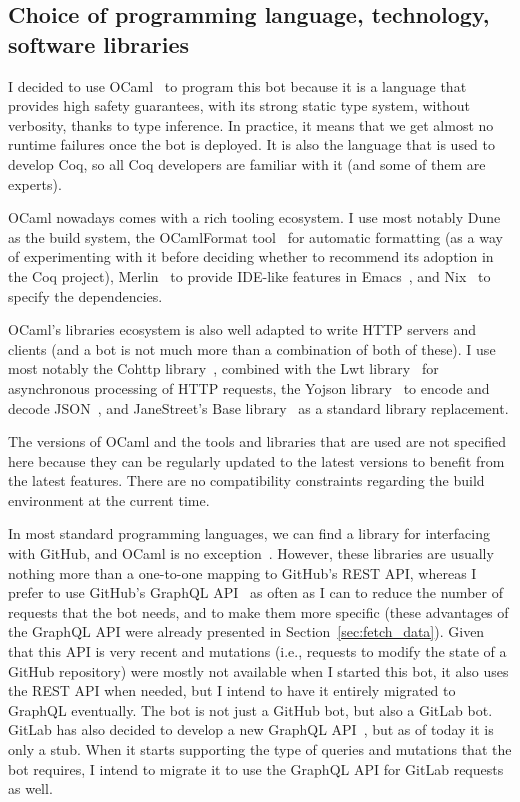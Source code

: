 \subsection{Choice of programming language, technology, software libraries}

I decided to use OCaml~\cite{leroy:hal-00930213} to program this bot because it is a language that provides high safety guarantees, with its strong static type system, without verbosity, thanks to type inference.
In practice, it means that we get almost no runtime failures once the bot is deployed.
It is also the language that is used to develop Coq, so all Coq developers are familiar with it (and some of them are experts). 

OCaml nowadays comes with a rich tooling ecosystem.
I use most notably Dune~\cite{dimino2016dune} as the build system, the OCamlFormat tool~\cite{ocamlformat} for automatic formatting (as a way of experimenting with it before deciding whether to recommend its adoption in the Coq project), Merlin~\cite{bour2018merlin} to provide IDE-like features in Emacs~\cite{stallman1981emacs}, and Nix~\cite{dolstra2004nix} to specify the dependencies.

OCaml's libraries ecosystem is also well adapted to write HTTP servers and clients (and a bot is not much more than a combination of both of these).
I use most notably the Cohttp library~\cite{cohttp2019}, combined with the Lwt library~\cite{vouillon2008lwt} for asynchronous processing of HTTP requests, the Yojson library~\cite{Yojson} to encode and decode JSON~\cite{json2017rfc}, and JaneStreet's Base library~\cite{JaneStreetBase} as a standard library replacement.

The versions of OCaml and the tools and libraries that are used are not specified here because they can be regularly updated to the latest versions to benefit from the latest features. There are no compatibility constraints regarding the build environment at the current time.

In most standard programming languages, we can find a library for interfacing with GitHub, and OCaml is no exception~\cite{github_REST_API}. However, these libraries are usually nothing more than a one-to-one mapping to GitHub's REST API, whereas I prefer to use GitHub's GraphQL API~\cite{github_graphql_API} as often as I can to reduce the number of requests that the bot needs, and to make them more specific (these advantages of the GraphQL API were already presented in Section~\ref{sec:fetch_data}).
Given that this API is very recent and mutations (i.e., requests to modify the state of a GitHub repository) were mostly not available when I started this bot, it also uses the REST API when needed, but I intend to have it entirely migrated to GraphQL eventually.
The bot is not just a GitHub bot, but also a GitLab bot.
GitLab has also decided to develop a new GraphQL API~\cite{gitlab_graphql_API}, but as of today it is only a stub. When it starts supporting the type of queries and mutations that the bot requires, I intend to migrate it to use the GraphQL API for GitLab requests as well.

